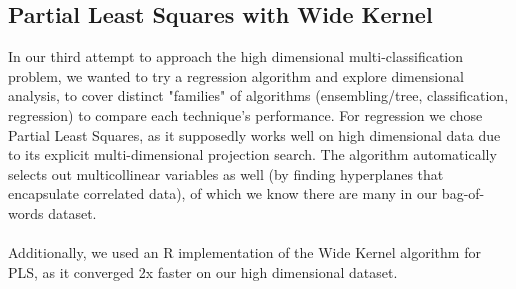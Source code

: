 \documentclass[9.5 pt]{article}
\begin{document}
\subsection{Partial Least Squares with Wide Kernel}
In our third attempt to approach the high dimensional multi-classification problem, we wanted to try a regression algorithm and explore dimensional analysis, to cover distinct "families" of algorithms (ensembling/tree, classification, regression) to compare each technique's performance. For regression we chose Partial Least Squares, as it supposedly works well on high dimensional data due to its explicit multi-dimensional projection search. The algorithm automatically selects out multicollinear variables as well (by finding hyperplanes that encapsulate correlated data), of which we know there are many in our bag-of-words dataset. \\ \\
Additionally, we used an R implementation of the Wide Kernel algorithm for PLS, as it converged 2x faster on our high dimensional dataset.

\setlength{\arrayrulewidth}{1mm}
\setlength{\tabcolsep}{8pt}
\renewcommand{\arraystretch}{1.0}
 
 
\end{document}

